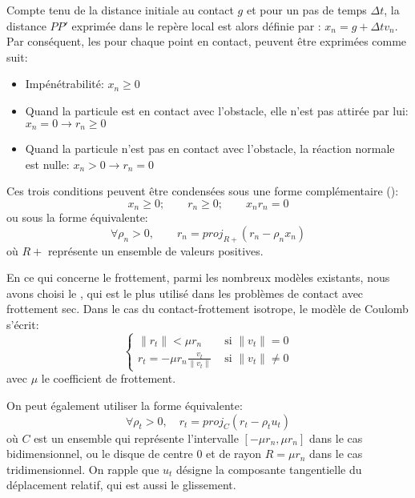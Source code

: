 Compte tenu de la distance initiale au contact $g$ et pour un pas de temps $\Delta t$, la distance 
$PP'$ exprimée dans le repère local est alors définie par : $x_n = g + \Delta t v_n$. 
Par conséquent, les  pour chaque point en contact,
peuvent être exprimées comme suit:
\begin{itemize}
   \item Impénétrabilité: $x_n \ge 0$
   \item Quand la particule est en contact avec l'obstacle, elle n'est pas attirée par lui:
	$x_n = 0 \rightarrow r_n \ge 0$
   \item Quand la particule n'est pas en contact avec l'obstacle, la réaction normale est nulle:
	$x_n > 0 \rightarrow r_n = 0$
\end{itemize}
Ces trois conditions peuvent être condensées sous une forme complémentaire ():
\begin{equation} x_n \ge 0; \qquad r_n \ge 0; \qquad x_n r_n = 0 \end{equation}
ou sous la forme équivalente:
\begin{equation} \forall \rho_n > 0, \qquad r_n = proj_{R+} (r_n - \rho_n x_n) \end{equation}
où $R+$ représente un ensemble de valeurs positives.

\medskip
En ce qui concerne le frottement, parmi les nombreux modèles existants, nous avons choisi le 
, 
qui est le plus utilisé dans les problèmes de contact avec frottement sec. 
Dans le cas du contact-frottement isotrope, le modèle de Coulomb s'écrit:
\begin{equation} \left\{\begin{array}{ll}
\|r_t\| < \mu r_n & \text{ si } \|v_t\|=0\\
r_t=-\mu r_n \frac{v_t}{\|v_t\|} & \text{ si } \|v_t\|\ne0
\end{array}\right. \end{equation}
avec $\mu$ le coefficient de frottement.

On peut également utiliser la forme équivalente:
\begin{equation}  \forall \rho_t>0, \quad r_t=proj_C (r_t-\rho_t u_t) \end{equation}
où $C$ est un ensemble qui représente l'intervalle $[-\mu r_n, \mu r_n]$ dans le cas bidimensionnel, 
ou le disque de centre $0$ et de rayon $R= \mu r_n$ dans le cas tridimensionnel.
On rapple que $u_t$ désigne la composante tangentielle du déplacement relatif, qui est
aussi le glissement.

